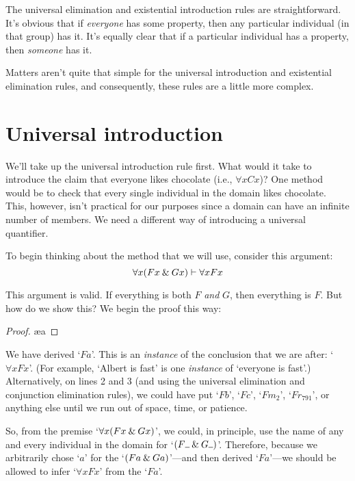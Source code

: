 The universal elimination and existential introduction rules are straightforward. It's obvious that if \textit{everyone} has some property, then any particular individual (in that group) has it. It's equally clear that if a particular individual has a property, then \textit{someone} has it.

Matters aren't quite that simple for the universal introduction and existential elimination rules, and consequently, these rules are a little more complex. 


\section{Universal introduction}

We'll take up the universal introduction rule first. What would it take to introduce the claim that everyone likes chocolate (i.e., $\forall x Cx$)? One method would be to check that every single individual in the domain likes chocolate. This, however, isn’t practical for our purposes since a domain can have an infinite number of members.
We need a different way of introducing a universal quantifier.

To begin thinking about the method that we will use, consider this argument:
$$\forall x (Fx \mathbin{\&} Gx) \vdash \forall x Fx$$

\noindent This argument is valid. If everything is both $F$ \emph{and} $G$, then everything is $F$.  But how do we show this?  We begin the proof this way:

\begin{proof}
	 \pr{}
	 
	 \ae{a}
\end{proof}
We have derived `$Fa$'. This is an \textit{instance} of the conclusion that we are after: `$\forall xFx$'. (For example, `Albert is fast' is one \textit{instance} of `everyone is fast'.) 
Alternatively, on lines 2 and 3 (and using the universal elimination and conjunction elimination rules), we could have put `$Fb$', `$Fc$', `$Fm_2$', `$Fr_{791}$', or anything else until we run out of space, time, or patience.   

So, from the premise `$\forall x (Fx \mathbin{\&} Gx)$', we could, in principle, use the name of any and every individual in the domain for `$(F\rule{1.7mm}{0.15mm} \eand G\rule{1.7mm}{0.15mm})$'.
Therefore, because we arbitrarily chose `$a$' for the `$(Fa \mathbin{\&} Ga)$'---and then derived `$Fa$'---we should be allowed to infer `$\forall x Fx$' from the `$Fa$'.  

